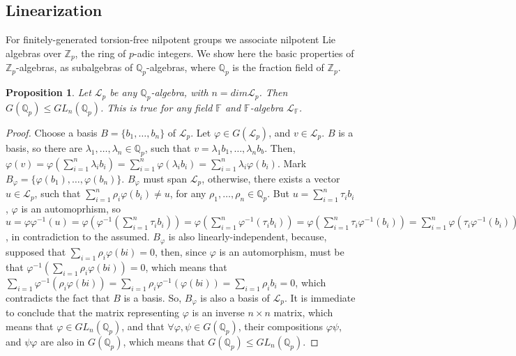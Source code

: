 \documentclass[12pt]{article}
\newtheorem{proposition}[theorem]{Proposition}
\begin{document}
\subsection{Linearization}
For finitely-generated torsion-free nilpotent groups we associate nilpotent Lie algebras over $\mathbb{Z}_p$, the ring of $p$-adic integers. We show here the basic properties of $\mathbb{Z}_p$-algebras, as subalgebras of $\mathbb{Q}_p$-algebras, where $\mathbb{Q}_p$ is the fraction field of $\mathbb{Z}_p$.
\begin{proposition}
\label{prop.automorphism.group}
Let $\mathcal{L}_p$ be any $\mathbb{Q}_p$-algebra, with $n=dim\mathcal{L}_p$. Then $G(\mathbb{Q}_p)\leq GL_n(\mathbb{Q}_p)$. This is true for any field $\mathbb{F}$ and $\mathbb{F}$-algebra $\mathcal{L}_{\mathbb{F}}$.
\end{proposition}
\begin{proof}
Choose a basis $B=\{b_1,\dots,b_n\}$ of 
$\mathcal{L}_p$. Let $\varphi\in G(\mathcal{L}_p)$, and $v\in\mathcal{L}_p$. $B$ is a basis, so there are $\lambda_1,\dots,\lambda_n\in\mathbb{Q}_p$, such that $v=\lambda_1b_1,\dots,\lambda_nb_b$. Then, $\varphi(v)=\varphi(\sum_{i=1}^n\lambda_ib_i)=\sum_{i=1}^n\varphi(\lambda_ib_i)=\sum_{i=1}^n\lambda_i\varphi(b_i)$. Mark $B_\varphi=\{\varphi(b_1),\dots,\varphi(b_n)\}$. $B_\varphi$ must span $\mathcal{L}_p$, otherwise, there exists a vector $u\in\mathcal{L}_p$, such that $\sum_{i=1}^n\rho_i\varphi(b_i)\neq u$, for any $\rho_1,\dots,\rho_n\in\mathbb{Q}_p$. But $u=\sum_{i=1}^n\tau_ib_i$, $\varphi$ is an automoprhism, so $u=\varphi\varphi^{-1}(u)=\varphi(\varphi^{-1}(\sum_{i=1}^n\tau_ib_i))=\varphi(\sum_{i=1}^n\varphi^{-1}(\tau_ib_i))=\varphi(\sum_{i=1}^n\tau_i\varphi^{-1}(b_i))=\sum_{i=1}^n\varphi(\tau_i\varphi^{-1}(b_i))=\sum_{i=1}^n\tau_i\varphi(\varphi^{-1}(b_i))=\sum_{i=1}^n\tau_ib_i$, in contradiction to the assumed. $B_\varphi
$ is also linearly-independent, because, supposed that $\sum_{i=1}\rho_i\varphi(bi)=0$, then, since $\varphi$ is an automorphism, must be that $\varphi^{-1}(\sum_{i=1}\rho_i\varphi(bi))=0$, which means that $\sum_{i=1}\varphi^{-1}(\rho_i\varphi(bi))=\sum_{i=1}\rho_i\varphi^{-1}(\varphi(bi))=\sum_{i=1}\rho_ib_i=0$, which contradicts the fact that $B$ is a basis. So, $B_\varphi$ is also a basis of $\mathcal{L}_p$. It is immediate to conclude that the matrix representing $\varphi$ is an inverse $n\times n$ matrix, which means that $\varphi\in GL
_n(\mathbb{Q}_p)$, and that $\forall\varphi,\psi\in G(\mathbb{Q}_p)$, their compositions $\varphi\psi$, and $\psi\varphi$ are also in $G(\mathbb{Q}_p)$, which means that $G(\mathbb{Q}_p)\leq GL_n(\mathbb{Q}_p)$.
\end{proof}
\end{document}
